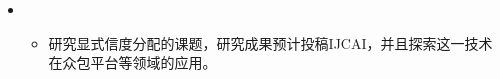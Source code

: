 \begin{itemize}[leftmargin=*]
  \item
        {\small
          \begin{itemize}
            \item 研究显式信度分配的课题，研究成果预计投稿IJCAI，并且探索这一技术在众包平台等领域的应用。
          \end{itemize}
        }
\end{itemize}